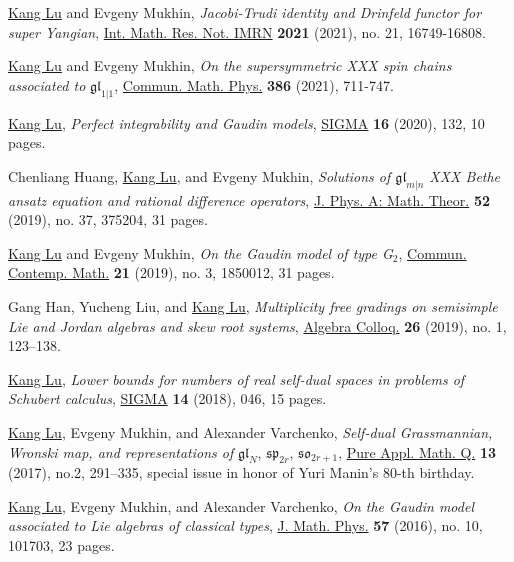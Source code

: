 \documentclass[11pt,letterpaper,roman%
]{moderncv}
\begin{document}
\begin{etaremune}[leftmargin=1cm]
\item \underline{Kang Lu} and Evgeny Mukhin, {\textit{Jacobi-Trudi identity and Drinfeld functor for super Yangian}}, \href{https://dx.doi.org/10.1093/imrn/rnab023}{Int. Math. Res. Not. IMRN} \textbf{2021} (2021), no. 21, 16749-16808.

\item \underline{Kang Lu} and Evgeny Mukhin, {\textit{On the supersymmetric XXX spin chains associated to} $\mathfrak{gl}_{1|1}$}, \href{https://dx.doi.org/10.1007/s00220-021-04155-2}{Commun. Math. Phys.} \textbf{386} (2021), 711-747.

\item \underline{Kang Lu}, \textit{Perfect integrability and Gaudin models}, \href{https://www.emis.de/journals/SIGMA/2020/132/}{SIGMA} \textbf{16} (2020), 132, 10 pages.
  
\item Chenliang Huang, \underline{Kang Lu}, and Evgeny Mukhin, {\textit{Solutions of $\mathfrak{gl}_{m|n}$ XXX Bethe ansatz equation and rational difference operators}}, \href{https://doi.org/10.1088/1751-8121/ab1960}{J. Phys. A: Math. Theor.} \textbf{52} (2019), no. 37, 375204, 31 pages.	
			
\item \underline{Kang Lu} and Evgeny Mukhin, {\textit{On the Gaudin model of type G$_2$}}, \href{https://doi.org/10.1142/S0219199718500128}{Commun. Contemp. Math.} \textbf{21} (2019), no. 3, 1850012, 31 pages.

\item Gang Han, Yucheng Liu, and \underline{Kang Lu}, {\textit{Multiplicity free gradings on semisimple Lie and Jordan algebras and skew root systems}}, \href{https://doi.org/10.1142/S1005386719000129}{Algebra Colloq.} {\textbf{26}} (2019), no. 1, 123--138.
			
\item \underline{Kang Lu}, {\textit{Lower bounds for numbers of real self-dual spaces in problems of Schubert calculus}}, \href{https://doi.org/10.3842/SIGMA.2018.046}{SIGMA} {\textbf{14}} (2018), 046, 15 pages.	
			
\item \underline{Kang Lu}, Evgeny Mukhin, and Alexander Varchenko, {\textit{Self-dual Grassmannian, Wronski map, and representations of} $\mathfrak{gl}_N$, $\mathfrak{sp}_{2r}$, $\mathfrak{so}_{2r+1}$}, \href{http://dx.doi.org/10.4310/PAMQ.2017.v13.n2.a4}{Pure Appl. Math. Q.} {\textbf{13}} (2017), no.2, 291--335, special issue in honor of Yuri Manin's 80-th birthday.
					
\item \underline{Kang Lu}, Evgeny Mukhin, and Alexander Varchenko, {\textit{On the Gaudin model associated to Lie algebras of classical types}}, \href{https://doi.org/10.1063/1.4964389}{J. Math. Phys.} {\textbf{57}} (2016), no. 10, 101703, 23 pages.
\end{etaremune}
	    
\end{document}
